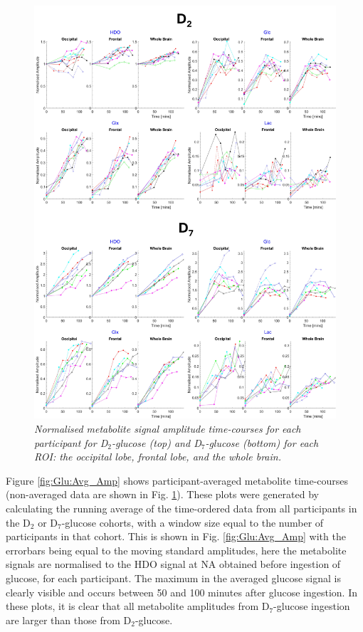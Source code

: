 \begin{figure}
    \centering
    \includegraphics[width = 1\textwidth]{Figures/Glucose/Ind_Amp.png}
    \caption{\textit{Normalised metabolite signal amplitude time-courses for each participant for D$_2$-glucose (top) and D$_7$-glucose (bottom) for each \ac{ROI}: the occipital lobe, frontal lobe, and the whole brain.}}
    \label{fig:Glu:Ind_Amp}
\end{figure}

Figure \ref{fig:Glu:Avg_Amp} shows participant-averaged metabolite time-courses (non-averaged data are shown in Fig. \ref{fig:Glu:Ind_Amp}). These plots were generated by calculating the running average of the time-ordered data from all participants in the D$_2$ or D$_7$-glucose cohorts, with a window size equal to the number of participants in that cohort. This is shown in Fig. \ref{fig:Glu:Avg_Amp} with the errorbars being equal to the moving standard  amplitudes, here the metabolite signals are normalised to the \ac{HDO} signal at \ac{NA} obtained before ingestion of glucose, for each participant. The maximum in the averaged glucose signal is clearly visible and occurs between 50 and 100 minutes after glucose ingestion. In these plots, it is clear that all metabolite amplitudes from D$_7$-glucose ingestion are larger than those from D$_2$-glucose. 

